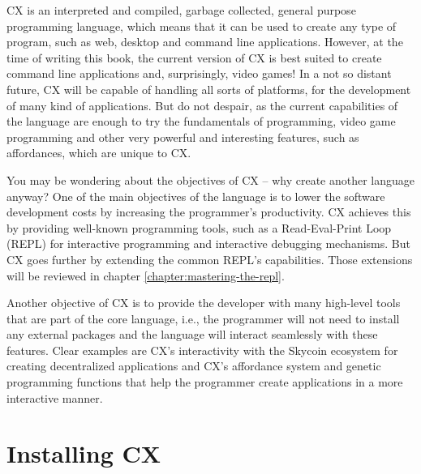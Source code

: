 \documentclass[11pt,fleqn,openany]{book} %
\begin{document}
CX is an interpreted and compiled, garbage collected, general purpose programming language, which means that it can be used to create any type of program, such as web, desktop and command line applications. However, at the time of writing this book, the current version of CX is best suited to create command line applications and, surprisingly, video games! In a not so distant future, CX will be capable of handling all sorts of platforms, for the development of many kind of applications. But do not despair, as the current capabilities of the language are enough to try the fundamentals of programming, video game programming and other very powerful and interesting features, such as affordances, which are unique to CX.

You may be wondering about the objectives of CX -- why create another language anyway? One of the main objectives of the language is to lower the software development costs by increasing the programmer's productivity. CX achieves this by providing well-known programming tools, such as a Read-Eval-Print Loop (REPL) for interactive programming and interactive debugging mechanisms. But CX goes further by extending the common REPL's capabilities. Those extensions will be reviewed in chapter \ref{chapter:mastering-the-repl}.

Another objective of CX is to provide the developer with many high-level tools that are part of the core language, i.e., the programmer will not need to install any external packages and the language will interact seamlessly with these features. Clear examples are CX's interactivity with the Skycoin ecosystem for creating decentralized applications and CX's affordance system and genetic programming functions that help the programmer create applications in a more interactive manner.

\section{Installing CX}

\end{document}
